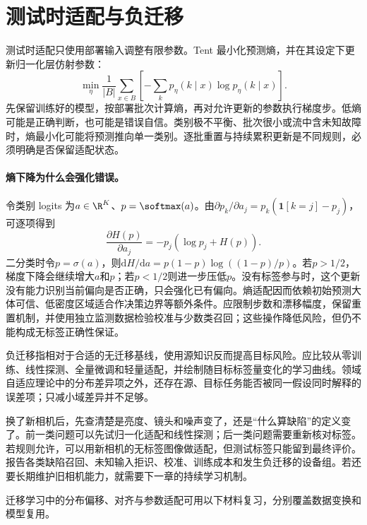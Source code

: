 \section{测试时适配与负迁移}
测试时适配只使用部署输入调整有限参数。Tent 最小化预测熵，并在其设定下更新归一化层仿射参数\cite{wang2021tent}：
\begin{equation}
 \min_{\eta}\frac1{|B|}\sum_{x\in B}
 \left[-\sum_kp_\eta(k\mid x)\log p_\eta(k\mid x)\right].
\end{equation}
先保留训练好的模型，按部署批次计算熵，再对允许更新的参数执行梯度步。低熵可能是正确判断，也可能是错误自信。类别极不平衡、批次很小或流中含未知故障时，熵最小化可能将预测推向单一类别。逐批重置与持续累积更新是不同规则，必须明确是否保留适配状态。

\paragraph{熵下降为什么会强化错误。}
令类别 logits 为$a\in\R^K$、$p=\softmax(a)$。由$\partial p_k/\partial a_j=p_k(\mathbf1[k=j]-p_j)$，可逐项得到
\begin{equation}
 \frac{\partial H(p)}{\partial a_j}=-p_j(\log p_j+H(p)).
\end{equation}
二分类时令$p=\sigma(a)$，则$\mathrm dH/\mathrm da=p(1-p)\log((1-p)/p)$。若$p>1/2$，梯度下降会继续增大$a$和$p$；若$p<1/2$则进一步压低$p$。没有标签参与时，这个更新没有能力识别当前偏向是否正确，只会强化已有偏向。熵适配因而依赖初始预测大体可信、低密度区域适合作决策边界等额外条件。应限制步数和漂移幅度，保留重置机制，并使用独立监测数据检验校准与少数类召回；这些操作降低风险，但仍不能构成无标签正确性保证。

负迁移指相对于合适的无迁移基线，使用源知识反而提高目标风险。应比较从零训练、线性探测、全量微调和轻量适配，并绘制随目标标签量变化的学习曲线。领域自适应理论中的分布差异项之外，还存在源、目标任务能否被同一假设同时解释的误差项\cite{bendavid2010theory}；只减小域差异并不足够。

换了新相机后，先查清楚是亮度、镜头和噪声变了，还是“什么算缺陷”的定义变了。前一类问题可以先试归一化适配和线性探测；后一类问题需要重新核对标签。若规则允许，可以用新相机的无标签图像做适配，但测试标签只能留到最终评价。报告各类缺陷召回、未知输入拒识、校准、训练成本和发生负迁移的设备组。若还要长期维护旧相机能力，就需要下一章的持续学习机制。

迁移学习中的分布偏移、对齐与参数适配可用以下材料复习，分别覆盖数据变换和模型复用。
